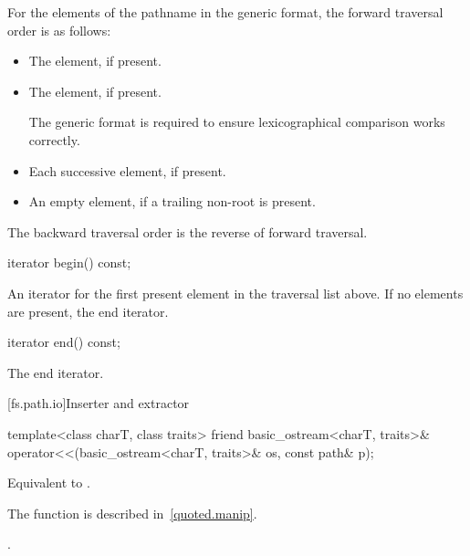 \pnum
For the elements of the pathname in the generic format,
the forward traversal order is as follows:
\begin{itemize}
\item The  element, if present.
\item The  element, if present.
\begin{note}
The generic format is required to ensure lexicographical
comparison works correctly. \end{note}
\item Each successive  element, if present.
\item An empty element, if a trailing non-root 
is present.
\end{itemize}

\pnum
The backward traversal order is the reverse of forward traversal.

%
\begin{itemdecl}
iterator begin() const;
\end{itemdecl}

\begin{itemdescr}
\pnum
\returns An iterator for the first present element in the traversal
list above. If no elements are present, the end iterator.
\end{itemdescr}

%
\begin{itemdecl}
iterator end() const;
\end{itemdecl}

\begin{itemdescr}
\pnum
\returns The end iterator.
\end{itemdescr}

[fs.path.io]{Inserter and extractor}

%
\begin{itemdecl}
template<class charT, class traits>
  friend basic_ostream<charT, traits>&
    operator<<(basic_ostream<charT, traits>& os, const path& p);
\end{itemdecl}

\begin{itemdescr}
\pnum
\effects Equivalent to .
\begin{note} The  function is described in~\ref{quoted.manip}. \end{note}

\pnum
\returns {}.
\end{itemdescr}

